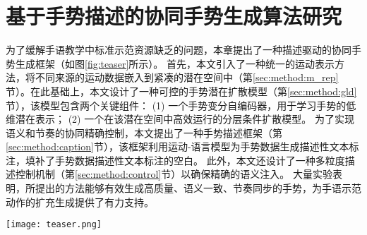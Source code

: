 
\chapter{基于手势描述的协同手势生成算法研究}
\label{sec:GG} 
为了缓解手语教学中标准示范资源缺乏的问题，本章提出了一种描述驱动的协同手势生成框架（如图\ref{fig:teaser}所示）。
首先，本文引入了一种统一的运动表示方法，将不同来源的运动数据嵌入到紧凑的潜在空间中（第\ref{sec:method:m_rep}节）。在此基础上，本文设计了一种可控的手势潜在扩散模型（第\ref{sec:method:gld}节），该模型包含两个关键组件：
(1) 一个手势变分自编码器，用于学习手势的低维潜在表示；
(2) 一个在该潜在空间中高效运行的分层条件扩散模型。
为了实现语义和节奏的协同精确控制，本文提出了一种手势描述框架（第\ref{sec:method:caption}节），该框架利用运动-语言模型为手势数据生成描述性文本标注，填补了手势数据描述性文本标注的空白。
此外，本文还设计了一种多粒度描述控制机制（第\ref{sec:method:control}节）以确保精确的语义注入。
大量实验表明，所提出的方法能够有效生成高质量、语义一致、节奏同步的手势，为手语示范动作的扩充生成提供了有力支持。

\begin{figure*}[!h]
  \centering
  \texttt{[image: teaser.png]}
  \caption{\textbf{CoordSpeaker} 支持手势字幕和定制的协同的说话者动作生成，既能与字幕保持语义一致，又能与音频保持节奏同步。例如，在演讲场景中，本文的方法允许说话者在讲话时自然地向前走并鞠躬，无缝地做出结束手势。} %
  \label{fig:teaser}
\end{figure*}

